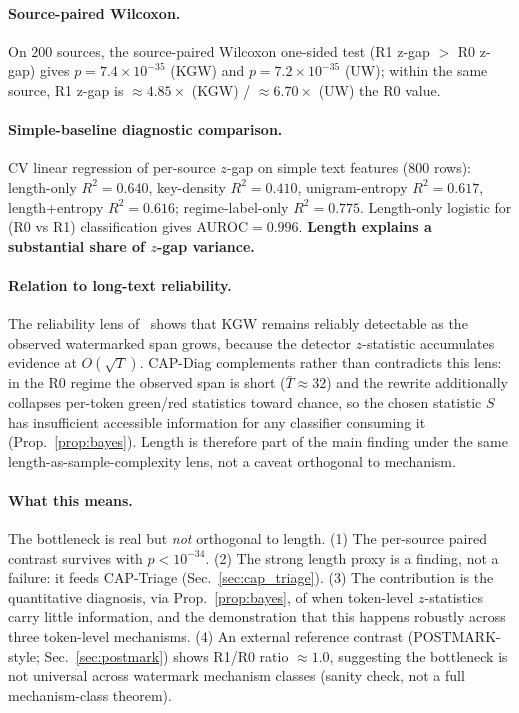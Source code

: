 \documentclass[11pt]{article}
\begin{document}
\paragraph{Source-paired Wilcoxon.}
On $200$ sources, the source-paired Wilcoxon one-sided test (R1 z-gap $>$
R0 z-gap) gives $p=7.4\times 10^{-35}$ (KGW) and $p=7.2\times 10^{-35}$
(UW); within the same source, R1 z-gap is $\approx 4.85\times$ (KGW) /
$\approx 6.70\times$ (UW) the R0 value.

\paragraph{Simple-baseline diagnostic comparison.} CV linear regression of
per-source $z$-gap on simple text features ($800$ rows): length-only
$R^2{=}0.640$, key-density $R^2{=}0.410$, unigram-entropy $R^2{=}0.617$,
length+entropy $R^2{=}0.616$; regime-label-only $R^2{=}0.775$.
Length-only logistic for (R0 vs R1) classification gives AUROC$=0.996$.
\textbf{Length explains a substantial share of $z$-gap variance.}

\paragraph{Relation to long-text reliability.}
The reliability lens of~\citet{kirchenbauer2024reliability} shows that
KGW remains reliably detectable as the observed watermarked span grows,
because the detector $z$-statistic accumulates evidence at
$O(\sqrt{T})$. CAP-Diag complements rather than contradicts this lens:
in the R0 regime the observed span is short ($\bar{T}\approx 32$) and the
rewrite additionally collapses per-token green/red statistics toward
chance, so the chosen statistic $S$ has insufficient accessible
information for any classifier consuming it (Prop.~\ref{prop:bayes}).
Length is therefore part of the main finding under the same
length-as-sample-complexity lens, not a caveat orthogonal to mechanism.

\paragraph{What this means.} The bottleneck is real but \emph{not}
orthogonal to length. (1) The per-source paired contrast survives with
$p<10^{-34}$. (2) The strong length proxy is a finding, not a failure: it
feeds CAP-Triage (Sec.~\ref{sec:cap_triage}). (3) The contribution is the
quantitative diagnosis, via Prop.~\ref{prop:bayes}, of when token-level
$z$-statistics carry little information, and the demonstration that this
happens robustly across three token-level mechanisms. (4) An external
reference contrast (POSTMARK-style; Sec.~\ref{sec:postmark}) shows R1/R0
ratio $\approx 1.0$, suggesting the bottleneck is not universal across
watermark mechanism classes (sanity check, not a full mechanism-class
theorem).
\end{document}
